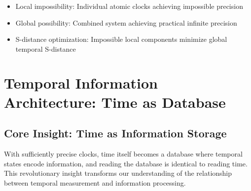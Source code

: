 \documentclass[12pt,a4paper]{article}
\begin{document}
{{{{{{{{{{{{{{\begin{itemize}
\item Local impossibility: Individual atomic clocks achieving impossible precision
\item Global possibility: Combined system achieving practical infinite precision
\item S-distance optimization: Impossible local components minimize global temporal S-distance
\end{itemize}

\section{Temporal Information Architecture: Time as Database}

\subsection{Core Insight: Time as Information Storage}

With sufficiently precise clocks, time itself becomes a database where temporal states encode information, and reading the database is identical to reading time. This revolutionary insight transforms our understanding of the relationship between temporal measurement and information processing.

\begin{figure}[H]
\centering
{}
\end{figure}}}}}}}}}}}}}}}
\end{document}
